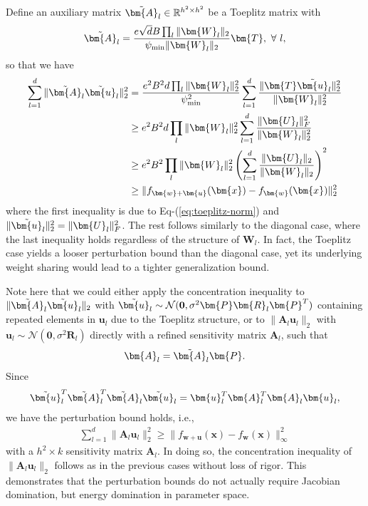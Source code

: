 \documentclass[journal]{IEEEtran} %
\def\eqref#1{Eq-(\ref{#1})}
\def\vu{{\bm{u}}}
\def\vw{{\bm{w}}}
\def\vx{{\bm{x}}}
\def\mA{{\bm{A}}}
\def\mP{{\bm{P}}}
\def\mR{{\bm{R}}}
\def\mT{{\bm{T}}}
\def\mU{{\bm{U}}}
\def\mW{{\bm{W}}}
\newcommand{\R}{\mathbb{R}}
\newcommand{\Norm}[1]{\|#1\|}
\begin{document}
Define an auxiliary matrix $\Tilde{\mA}_l \in \R^{h^2 \times h^2}$ be a Toeplitz matrix with
\begin{align}
        \Tilde{\mA}_l =  \frac{ e\sqrt{d}B  \prod_l \Norm{\mW_l}_2}{\psi_{\min}\Norm{\mW_l}_2}\mT, \ \forall~l,
    \end{align}
so that we have
\begin{align}
    \sum_{l=1}^d\Norm{\Tilde{\mA}_l \Tilde{\vu}_l}_2^2 &= \frac{e^2B^2d\prod_l \Norm{\mW_l}_2^2}{\psi_{\min}^2} 
    \sum_{l=1}^d \frac{\Norm{\mT \Tilde{\vu}_l}_2^2}{\Norm{\mW_l}_2^2} \\
    &\ge e^2B^2 d\prod_l \Norm{\mW_l}_2^2  \sum_{l=1}^d \frac{\Norm{\mU_l}_F^2}{\Norm{\mW_l}_2^2} \\
    &\ge e^2B^2 \prod_l \Norm{\mW_l}_2^2 \left(\sum_{l=1}^d \frac{\Norm{\mU_l}_2}{\Norm{\mW_l}_2}\right)^2 \\
    &\ge \Norm{f_{\vw+\vu}(\vx)-f_{\vw}(\vx)}_2^2
\end{align}
where the first inequality is due to \eqref{eq:toeplitz-norm} and $\Norm{\Tilde{\vu}_l}_2^2=\Norm{\mU_l}_F^2$. The rest follows similarly to the diagonal case, where the last inequality holds regardless of the structure of $\mW_l$. In fact, the Toeplitz case yields a looser perturbation bound than the diagonal case, yet its underlying weight sharing would lead to a tighter generalization bound.

Note here that we could either apply the concentration inequality to $\Norm{\Tilde{\mA}_l \Tilde{\vu}_l}_2$ with $\Tilde{\vu}_l \sim \mathcal{N}(\mathbf{0}, \sigma^2\mP \mR_l \mP^T)$ containing repeated elements in $\vu_l$ due to the Toeplitz structure, or to $\Norm{{\mA}_l {\vu}_l}_2$ with $\vu_l \sim \mathcal{N}(\mathbf{0},\sigma^2\mR_l)$ directly with a refined sensitivity matrix $\mA_l$, such that
\begin{align}
    \mA_l = \Tilde{\mA}_l \mP.
\end{align}
Since
\begin{align}
    \Tilde{\vu}_l^T \Tilde{\mA}_l^T \Tilde{\mA}_l \Tilde{\vu}_l = \vu_l^T \mA_l^T \mA_l \vu_l,
\end{align}
we have the perturbation bound holds, i.e.,
\begin{align}
    \sum_{l=1}^d\Norm{{\mA}_l {\vu}_l}_2^2 \ge \Norm{f_{\vw+\vu}(\vx)-f_{\vw}(\vx)}_{\infty}^2
\end{align}
with a $h^2 \times k$ sensitivity matrix $\mA_l$.
% 
In doing so, the concentration inequality of $\Norm{\mA_l \vu_l}_2$ follows as in the previous cases without loss of rigor.
This demonstrates that the perturbation bounds do not actually require Jacobian domination, but energy domination in parameter space.
\end{document}
